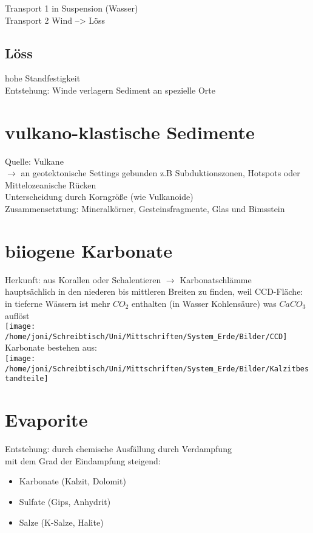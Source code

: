 \documentclass[a4,12pt]{scrreprt}
\begin{document}
Transport 1 in Suspension (Wasser)\\
Transport 2 Wind --> Löss\\

\subsection{Löss}
hohe Standfestigkeit\\
Entstehung: Winde verlagern Sediment an spezielle Orte\\

\section{vulkano-klastische Sedimente}
Quelle: Vulkane\\
$\rightarrow$ an geotektonische Settings gebunden z.B Subduktionszonen, Hotspots oder Mittelozeanische Rücken\\

Unterscheidung durch Korngröße (wie Vulkanoide)\\
Zusammensetztung: Mineralkörner, Gesteinsfragmente, Glas und Bimsstein\\

\section{biiogene Karbonate}

Herkunft: aus Korallen oder Schalentieren $\rightarrow$ Karbonatschlämme\\
hauptsächlich in den niederen bis mittleren Breiten zu finden, weil CCD-Fläche:\\
in tieferne Wässern ist mehr $CO_2$ enthalten (in Wasser Kohlensäure) was $CaCO_3$ auflöst\\


\texttt{[image: /home/joni/Schreibtisch/Uni/Mittschriften/System\_Erde/Bilder/CCD]}\\

\newpage
Karbonate bestehen aus: \\

\texttt{[image: /home/joni/Schreibtisch/Uni/Mittschriften/System\_Erde/Bilder/Kalzitbestandteile]}\\

\section{Evaporite}
Entstehung: durch chemische Ausfällung durch Verdampfung\\
mit dem Grad der Eindampfung steigend:
\begin{itemize}
\item Karbonate (Kalzit, Dolomit)
\item Sulfate (Gips, Anhydrit)
\item Salze (K-Salze, Halite)
\end{itemize}
\end{document}
